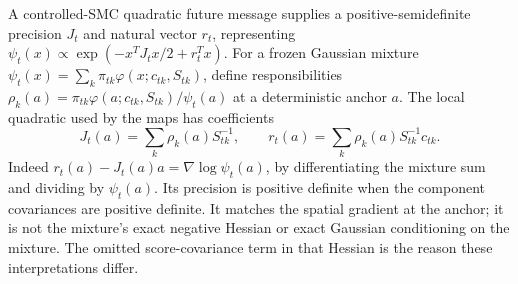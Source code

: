 A controlled-SMC quadratic future message supplies a positive-semidefinite
precision $J_t$ and natural vector $r_t$, representing
$\psi_t(x)\propto\exp(-x^TJ_tx/2+r_t^Tx)$. For a frozen Gaussian mixture
$\psi_t(x)=\sum_k\pi_{tk}\varphi(x;c_{tk},S_{tk})$, define responsibilities
$\rho_k(a)=\pi_{tk}\varphi(a;c_{tk},S_{tk})/\psi_t(a)$ at a deterministic
anchor $a$. The local quadratic used by the maps has coefficients
\begin{equation}
 J_t(a)=\sum_k\rho_k(a)S_{tk}^{-1},\qquad
 r_t(a)=\sum_k\rho_k(a)S_{tk}^{-1}c_{tk}.
 \label{eq:bg-mixture-future-information}
\end{equation}
Indeed $r_t(a)-J_t(a)a=\nabla\log\psi_t(a)$, by differentiating the mixture
sum and dividing by $\psi_t(a)$. Its precision is positive definite when
the component covariances are positive definite. It matches the spatial
gradient at the anchor; it is not the mixture's exact negative Hessian or
exact Gaussian conditioning on the mixture. The omitted score-covariance
term in that Hessian is the reason these interpretations differ.

